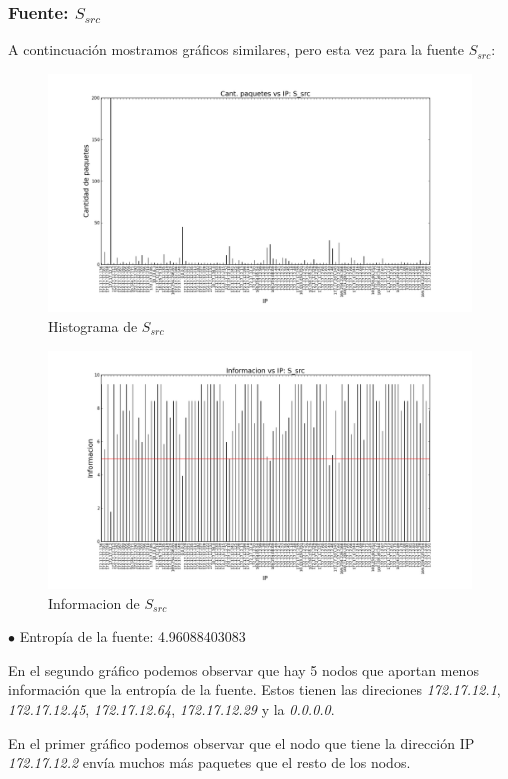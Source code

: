 \subsubsection{Fuente: $S_{src}$}

A contincuación mostramos gráficos similares, pero esta vez para la fuente $S_{src}$:

\begin{figure}[H]\centering
    \includegraphics[width=0.8\linewidth]{../imgs/red-alto-palermo_S_src_hist.png}
    \caption{Histograma de $S_{src}$}\label{fig:Alto-src-hist}
\end{figure}

\begin{figure}[H]\centering
    \includegraphics[width=0.8\linewidth]{../imgs/red-alto-palermo_S_src_info.png}
    \caption{Informacion de $S_{src}$}\label{fig:Alto-src-info}
\end{figure}

$\bullet$ Entropía de la fuente: 4.96088403083

En el segundo gráfico podemos observar que hay 5 nodos que aportan menos información que la entropía de la fuente. Estos tienen las direciones \emph{172.17.12.1}, \emph{172.17.12.45}, \emph{172.17.12.64}, \emph{172.17.12.29} y la \emph{0.0.0.0}. 

En el primer gráfico podemos observar que el nodo que tiene la dirección IP \emph{172.17.12.2} envía muchos más paquetes que el resto de los nodos. 


